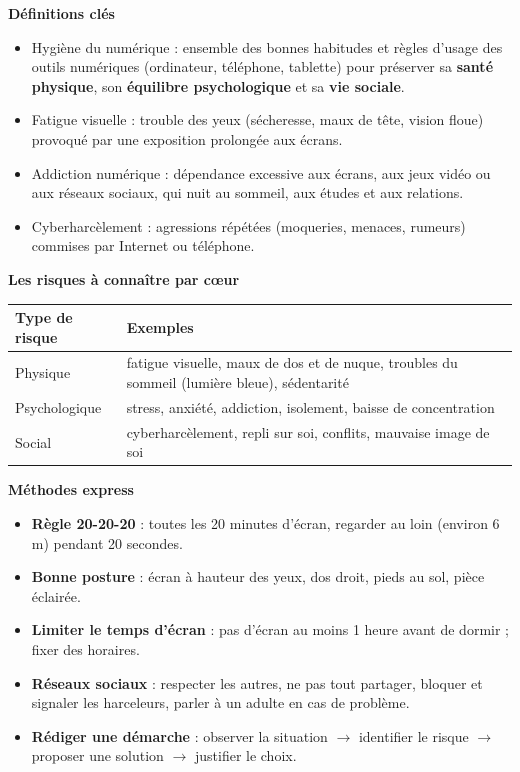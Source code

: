 \documentclass[11pt]{article}
\newcommand{\cle}[1]{{\popxbold\color{popdark}#1}}
\begin{document}
\begin{bilan}
\textbf{Définitions clés}
\begin{itemize}
  \item \cle{Hygiène du numérique} : ensemble des bonnes habitudes et règles d'usage des outils numériques (ordinateur, téléphone, tablette) pour préserver sa \textbf{santé physique}, son \textbf{équilibre psychologique} et sa \textbf{vie sociale}.
  \item \cle{Fatigue visuelle} : trouble des yeux (sécheresse, maux de tête, vision floue) provoqué par une exposition prolongée aux écrans.
  \item \cle{Addiction numérique} : dépendance excessive aux écrans, aux jeux vidéo ou aux réseaux sociaux, qui nuit au sommeil, aux études et aux relations.
  \item \cle{Cyberharcèlement} : agressions répétées (moqueries, menaces, rumeurs) commises par Internet ou téléphone.
\end{itemize}

\textbf{Les risques à connaître par c\oe ur}
\begin{center}
\begin{tabularx}{\linewidth}{|l|X|}
\hline
\rowcolor{popblueL} \textbf{Type de risque} & \textbf{Exemples} \\
\hline
Physique & fatigue visuelle, maux de dos et de nuque, troubles du sommeil (lumière bleue), sédentarité \\
\hline
Psychologique & stress, anxiété, addiction, isolement, baisse de concentration \\
\hline
Social & cyberharcèlement, repli sur soi, conflits, mauvaise image de soi \\
\hline
\end{tabularx}
\end{center}

\textbf{Méthodes express}
\begin{itemize}
  \item \textbf{Règle 20-20-20} : toutes les 20 minutes d'écran, regarder au loin (environ 6 m) pendant 20 secondes.
  \item \textbf{Bonne posture} : écran à hauteur des yeux, dos droit, pieds au sol, pièce éclairée.
  \item \textbf{Limiter le temps d'écran} : pas d'écran au moins 1 heure avant de dormir ; fixer des horaires.
  \item \textbf{Réseaux sociaux} : respecter les autres, ne pas tout partager, bloquer et signaler les harceleurs, parler à un adulte en cas de problème.
  \item \textbf{Rédiger une démarche} : observer la situation $\rightarrow$ identifier le risque $\rightarrow$ proposer une solution $\rightarrow$ justifier le choix.
\end{itemize}
\end{bilan}
\end{document}
